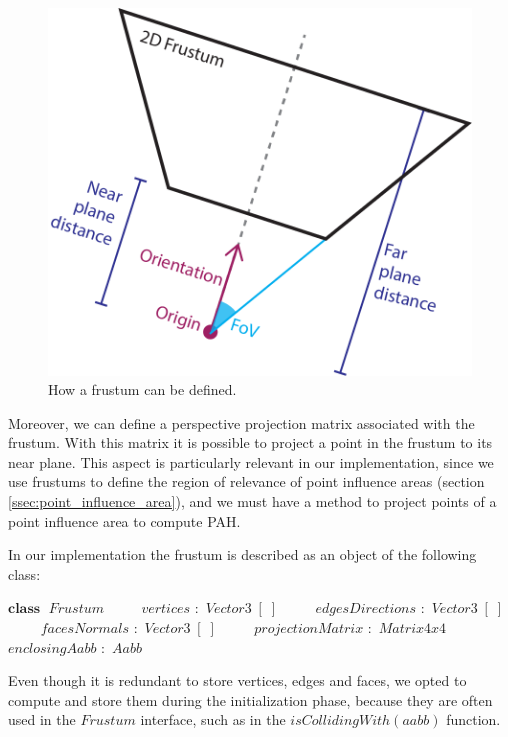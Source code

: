 \documentclass{PoliMi_MasterThesis}
\newcommand*\Class[1]{\State $\textbf{class} \;$ #1}
\newcommand*\Member[2]{\State $\qquad$ #1 $:$ #2}
\begin{document}
\begin{figure}[H]
    \centering
    \includegraphics[width=\textwidth*\real{0.45}]{Images/frustum_definition.png}
    \caption{How a frustum can be defined.}
    \label{fig:frustum}
\end{figure}

Moreover, we can define a perspective projection matrix associated with the frustum. With this matrix it is possible to project a point in the frustum to its near plane. This aspect is particularly relevant in our implementation, since we use frustums to define the region of relevance of point influence areas (section \ref{ssec:point_influence_area}), and we must have a method to project points of a point influence area to compute PAH.

In our implementation the frustum is described as an object of the following class:
\begin{algorithm}[H]
	\begin{algorithmic}
		\Class{$Frustum$}
		\Member{$vertices$}{$Vector3\;[\;]$}
		\Member{$edgesDirections$}{$Vector3\;[\;]$}
		\Member{$facesNormals$}{$Vector3\;[\;]$}
		\Member{$projectionMatrix$}{$Matrix4x4$}
		\Member{$enclosingAabb$}{$Aabb$}
	\end{algorithmic}
\end{algorithm} 

Even though it is redundant to store vertices, edges and faces, we opted to compute and store them during the initialization phase, because they are often used in the $Frustum$ interface, such as in the $isCollidingWith(aabb)$ function. 
\end{document}
